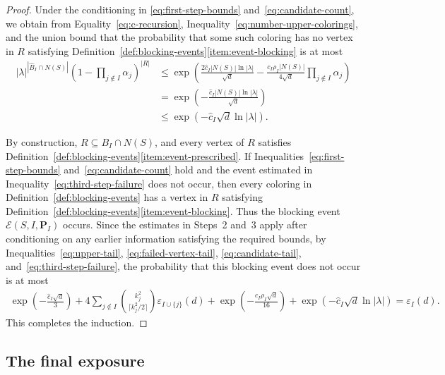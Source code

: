 \documentclass[12pt]{article}
\numberwithin{equation}{section}
\theoremstyle{definition}
\begin{document}
\begin{proof}
Under the conditioning in \eqref{eq:first-step-bounds}
and~\eqref{eq:candidate-count}, we obtain from
Equality~\eqref{eq:c-recursion}, Inequality~\eqref{eq:number-upper-colorings},
and the union bound that the probability that some such coloring has no
vertex in $R$ satisfying
Definition~\ref{def:blocking-events}\ref{item:event-blocking} is at most
\begin{equation}\label{eq:third-step-failure}
\begin{aligned}
|\lambda|^{|\hat{B}_{I} \cap N(S)|}
\left(1 - \prod_{j \notin I}\alpha_j\right)^{|R|}
 & \leq \exp\left(
 \frac{2\hat{c}_{I}|N(S)|\ln |\lambda|}{\sqrt{d}}
 -\frac{c_I\rho_I|N(S)|}{4\sqrt{d}}
 \prod_{j \notin I}\alpha_j
 \right) \\
 & = \exp\left(
 -\frac{\hat{c}_{I}|N(S)|\ln |\lambda|}{\sqrt{d}}
 \right)\\
 & \leq
 \exp\left(-\hat{c}_{I}\sqrt{d}\ln |\lambda|\right).
\end{aligned}
\end{equation}

By construction, $R \subseteq B_I \cap N(S)$, and every vertex of $R$
satisfies Definition~\ref{def:blocking-events}\ref{item:event-prescribed}.
If Inequalities~\eqref{eq:first-step-bounds} and~\eqref{eq:candidate-count}
hold and the event estimated in Inequality~\eqref{eq:third-step-failure} does
not occur, then every coloring in Definition~\ref{def:blocking-events} has a
vertex in $R$ satisfying
Definition~\ref{def:blocking-events}\ref{item:event-blocking}. Thus the
blocking event $\mathcal{E}(S,I,\mathbf{P}_I)$ occurs. Since the estimates in
Steps~2 and~3 apply after conditioning on any earlier information satisfying
the required bounds,
by Inequalities~\eqref{eq:upper-tail}, \eqref{eq:failed-vertex-tail},
\eqref{eq:candidate-tail}, and~\eqref{eq:third-step-failure}, the probability
that this blocking event does not occur is at most
\begin{align*}
 \exp\left(-\frac{\hat{c}_{I}\sqrt{d}}{3}\right)
 +4\sum_{j \notin I}
 \binom{k_j^2}{\lceil k_j^2/2\rceil}
 \varepsilon_{I \cup \{j\}}(d)
 +\exp\left(-\frac{c_I\rho_I\sqrt{d}}{16}\right)
 +\exp\left(-\hat{c}_{I}\sqrt{d}\ln |\lambda|\right)
 = \varepsilon_I(d).
\end{align*}
This completes the induction.
\end{proof}

\subsection{The final exposure}
\label{subsec:final-exposure}
\end{document}
